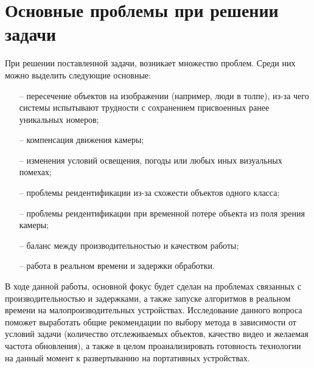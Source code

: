 \section{Основные проблемы при решении задачи}
При решении поставленной задачи, возникает множество проблем. Среди них можно выделить следующие основные:
\begin{itemize}
    \item[--] пересечение объектов на изображении (например, люди в толпе), из-за чего системы испытывают трудности с сохранением присвоенных ранее уникальных номеров;
    \item[--] компенсация движения камеры;
    \item[--] изменения условий освещения, погоды или любых иных визуальных помехах;
    \item[--] проблемы реидентификации из-за схожести объектов одного класса;
    \item[--] проблемы реидентификации при временной потере объекта из поля зрения камеры;
    \item[--] баланс между производительностью и качеством работы;
    \item[--] работа в реальном времени и задержки обработки.
\end{itemize}

В ходе данной работы, основной фокус будет сделан на проблемах связанных с производительностью и задержками, а также запуске алгоритмов в реальном времени на малопроизводительных устройствах. 
Исследование данного вопроса поможет выработать общие рекомендации по выбору метода в зависимости от условий задачи (количество отслеживаемых объектов, качество видео и желаемая частота обновления), а также в целом проанализировать готовность технологии на данный момент к развертыванию на портативных устройствах.

